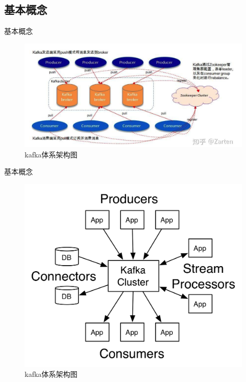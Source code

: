 \subsection{ 基本概念}
\begin{frame}[plain,t]{基本概念} %
	 \\  
	\vspace{2ex}
	\begin{figure}
		\centering
		\includegraphics[width=0.9\linewidth]{image/0101}
		\caption{kafka体系架构图}
		\label{fig:0101}
	\end{figure}
	
     
\end{frame}
\begin{frame}[plain,t]{基本概念} %
	 \\  
	 \vspace{2ex}
	 	\begin{figure}
	 	\centering
	 	\includegraphics[width=0.7\linewidth]{image/0102}
	 	\caption{kafka体系架构图}
	 	\label{fig:0102}
	 \end{figure}
	
	
	
\end{frame}

